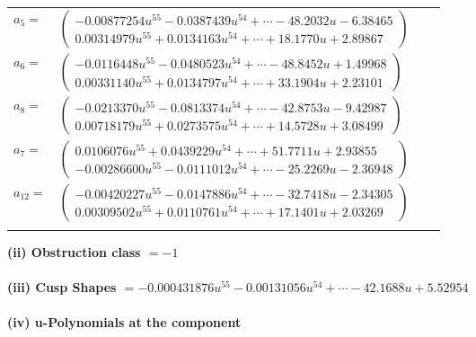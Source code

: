 \documentclass[1p]{elsarticle_modified}
\theoremstyle{definition}
\begin{document}
\begin{tabular}{m{7pt} m{180pt} m{7pt} m{180pt} }
\flushright $a_{5}=$&$\begin{pmatrix}-0.00877254 u^{55}-0.0387439 u^{54}+\cdots-48.2032 u-6.38465\\0.00314979 u^{55}+0.0134163 u^{54}+\cdots+18.1770 u+2.89867\end{pmatrix}$ \\
\flushright $a_{6}=$&$\begin{pmatrix}-0.0116448 u^{55}-0.0480523 u^{54}+\cdots-48.8452 u+1.49968\\0.00331140 u^{55}+0.0134797 u^{54}+\cdots+33.1904 u+2.23101\end{pmatrix}$ \\
\flushright $a_{8}=$&$\begin{pmatrix}-0.0213370 u^{55}-0.0813374 u^{54}+\cdots-42.8753 u-9.42987\\0.00718179 u^{55}+0.0273575 u^{54}+\cdots+14.5728 u+3.08499\end{pmatrix}$ \\
\flushright $a_{7}=$&$\begin{pmatrix}0.0106076 u^{55}+0.0439229 u^{54}+\cdots+51.7711 u+2.93855\\-0.00286600 u^{55}-0.0111012 u^{54}+\cdots-25.2269 u-2.36948\end{pmatrix}$ \\
\flushright $a_{12}=$&$\begin{pmatrix}-0.00420227 u^{55}-0.0147886 u^{54}+\cdots-32.7418 u-2.34305\\0.00309502 u^{55}+0.0110761 u^{54}+\cdots+17.1401 u+2.03269\end{pmatrix}$\\&\end{tabular}
\flushleft \textbf{(ii) Obstruction class $= -1$}\\~\\
\flushleft \textbf{(iii) Cusp Shapes $= -0.000431876 u^{55}-0.00131056 u^{54}+\cdots-42.1688 u+5.52954$}\\~\\
\newpage\renewcommand{\arraystretch}{1}
\flushleft \textbf{(iv) u-Polynomials at the component}\newline \\
\end{document}
